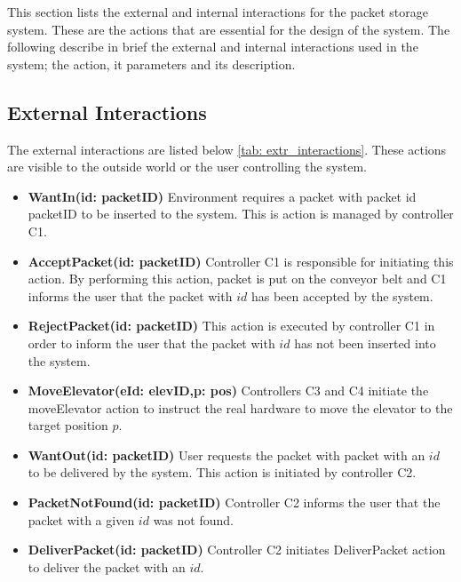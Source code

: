 \label{sec:ext_interactions}
This section lists the external and internal interactions for the packet storage system. These are the actions that are essential for the design of the system. The following describe in brief the external and internal interactions used in the system; the action, it parameters and its description.

\subsection*{External Interactions} The external interactions are listed below \ref{tab: extr_interactions}. These actions are visible to the outside world or the user controlling the system.

\begin{itemize}
\item \textbf{WantIn(id: packetID)}
Environment requires a packet with packet id packetID to be inserted to the system. This is action is managed by controller C1.

\item \textbf{AcceptPacket(id: packetID)}
Controller C1 is responsible for initiating this action. By performing this action, packet is put on the conveyor belt and C1 informs the user that the packet with $id$ has been accepted by the system.

\item \textbf{RejectPacket(id: packetID)}
This action is executed by controller C1 in order to inform the user that the packet with $id$ has not been inserted into the system.

\item \textbf{MoveElevator(eId: elevID,p: pos)}
Controllers C3 and C4 initiate the moveElevator action to instruct the real hardware to move the elevator to the target position $p$.

\item \textbf{WantOut(id: packetID)}
User requests the packet with packet with an $id$ to be delivered by the system. This action is initiated by controller C2.

\item \textbf{PacketNotFound(id: packetID)}
Controller C2 informs the user that the packet with a given $id$ was not found.

\item \textbf{DeliverPacket(id: packetID)}
Controller C2 initiates DeliverPacket action to deliver the packet with an $id$.


\end{itemize}
